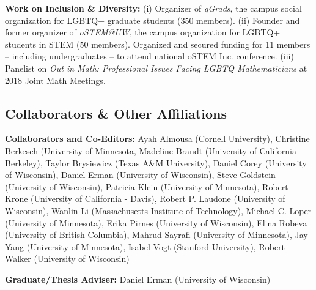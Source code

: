 \documentclass[svgnames,11pt]{article}
\begin{document}
\begin{bibenum}[itemsep=4pt]
    \item \textbf{Work on Inclusion \& Diversity:}
    (i) Organizer of \textit{qGrads}, the campus social organization for LGBTQ+ graduate students (350 members).
    (ii) Founder and former organizer of \textit{oSTEM@UW}, the campus organization for LGBTQ+ students in STEM (50 members). Organized and secured funding for 11 members -- including undergraduates -- to attend national oSTEM Inc. conference. 
    (iii) Panelist on \textit{Out in Math: Professional Issues Facing LGBTQ Mathematicians} at 2018 Joint Math Meetings. 
      

\end{bibenum}

\subsection{Collaborators \& Other Affiliations}

\begin{bibsection}

    \item \textbf{Collaborators and Co-Editors:}
	    Ayah Almousa (Cornell University),
	    Christine Berkesch (University of Minnesota,
	    Madeline Brandt (University of California - Berkeley),
	    Taylor Brysiewicz (Texas A\&M University),
	    Daniel Corey (University of Wisconsin),
            Daniel Erman (University of Wisconsin),
            Steve Goldstein (University of Wisconsin),
            Patricia Klein (University of Minnesota),
            Robert Krone (University of California - Davis),
            Robert P. Laudone (University of Wisconsin),
            Wanlin Li (Massachusetts Institute of Technology),
            Michael C. Loper (University of Minnesota),
            Erika Pirnes (University of Wisconsin),
            Elina Robeva (University of British Columbia),
            Mahrud Sayrafi (University of Minnesota),
            Jay Yang (University of Minnesota),
            Isabel Vogt (Stanford University),
            Robert Walker (University of Wisconsin)
            

    \item \textbf{Graduate/Thesis Adviser:}
        Daniel Erman (University of Wisconsin)


\end{bibsection}
\end{document}
